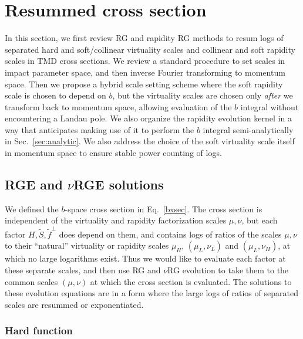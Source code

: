 \documentclass[a4,letterpaper,11pt]{article}
\newcommand{\wt}{\widetilde}
\newcommand{\eq}[1]{Eq.~\eqref{#1}}
\renewcommand{\sec}[1]{Sec.~\ref{sec:#1}}
\begin{document}
\section{Resummed cross section}
\label{sec:resumxsec}

In this section, we first review RG and rapidity RG methods to resum logs of separated hard and soft/collinear virtuality scales and collinear and soft rapidity scales in TMD cross sections. We review a standard procedure to set scales in impact parameter space, and then inverse Fourier transforming to momentum space. Then we propose a hybrid scale setting scheme where the soft rapidity scale is chosen to depend on $b$, but the virtuality scales are chosen only \emph{after} we transform back to momentum space, allowing evaluation of the $b$ integral without encountering a Landau pole. We also organize the rapidity evolution kernel in a way that anticipates making use of it to perform the $b$ integral semi-analytically in \sec{analytic}. We also address the choice of the soft virtuality scale itself in momentum space to ensure stable power counting of logs.

\subsection{RGE and $\nu$RGE solutions}

We defined the $b$-space cross section in \eq{bxsec}.
The cross section is independent of the virtuality and rapidity factorization scales $\mu,\nu$, but each factor $H,\wt S,\wt f^\perp$ does depend on them, and contains logs of ratios of the scales $\mu,\nu$ to their ``natural'' virtuality or rapidity scales $\mu_H$, $(\mu_L,\nu_L)$ and $(\mu_L,\nu_H)$, at which no large logarithms exist.  Thus we would like to evaluate each factor at these separate scales, and then use RG and $\nu$RG evolution to take them to the common scales $(\mu,\nu)$ at which the cross section is evaluated. The solutions to these evolution equations are in a form where the large logs of ratios of separated scales are resummed or exponentiated.

\subsubsection{Hard function}
\end{document}

